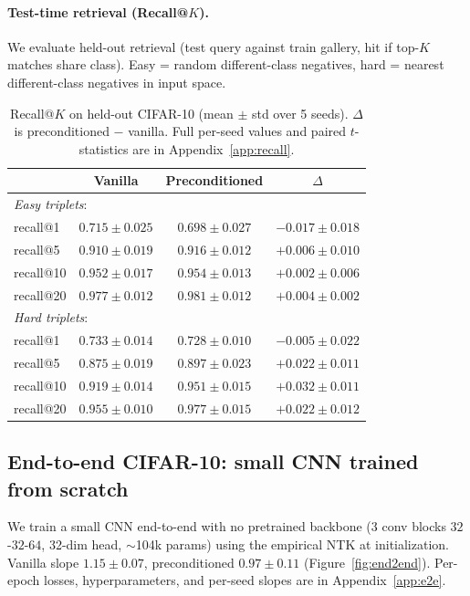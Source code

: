 \documentclass[11pt,letterpaper]{article}
\begin{document}
\paragraph{Test-time retrieval (Recall@$K$).}
We evaluate held-out retrieval (test query against train gallery, hit if
top-$K$ matches share class). Easy = random different-class negatives,
hard = nearest different-class negatives in input space.

\begin{table}[h]
\centering
\caption{Recall@$K$ on held-out CIFAR-10 (mean $\pm$ std over 5 seeds).
$\Delta$ is preconditioned $-$ vanilla. Full per-seed values and paired
$t$-statistics are in Appendix~\ref{app:recall}.}
\label{tab:recall}
\begin{tabular}{lccc}
\toprule
& Vanilla & Preconditioned & $\Delta$ \\
\midrule
\multicolumn{4}{l}{\emph{Easy triplets}:} \\
recall@1  & $0.715 \pm 0.025$ & $0.698 \pm 0.027$ & $-0.017 \pm 0.018$ \\
recall@5  & $0.910 \pm 0.019$ & $0.916 \pm 0.012$ & $+0.006 \pm 0.010$ \\
recall@10 & $0.952 \pm 0.017$ & $0.954 \pm 0.013$ & $+0.002 \pm 0.006$ \\
recall@20 & $0.977 \pm 0.012$ & $0.981 \pm 0.012$ & $+0.004 \pm 0.002$ \\
\midrule
\multicolumn{4}{l}{\emph{Hard triplets}:} \\
recall@1  & $0.733 \pm 0.014$ & $0.728 \pm 0.010$ & $-0.005 \pm 0.022$ \\
recall@5  & $0.875 \pm 0.019$ & $0.897 \pm 0.023$ & $\mathbf{+0.022 \pm 0.011}$ \\
recall@10 & $0.919 \pm 0.014$ & $0.951 \pm 0.015$ & $\mathbf{+0.032 \pm 0.011}$ \\
recall@20 & $0.955 \pm 0.010$ & $0.977 \pm 0.015$ & $\mathbf{+0.022 \pm 0.012}$ \\
\bottomrule
\end{tabular}
\end{table}

\subsection{End-to-end CIFAR-10: small CNN trained from scratch}
\label{sec:exp-end2end}

We train a small CNN end-to-end with no pretrained backbone (3 conv blocks
$32$-$32$-$64$, 32-dim head, $\sim$104k params) using the empirical NTK at
initialization. Vanilla slope $1.15 \pm 0.07$, preconditioned $0.97 \pm 0.11$
(Figure~\ref{fig:end2end}). Per-epoch losses, hyperparameters, and per-seed
slopes are in Appendix~\ref{app:e2e}.
\end{document}
